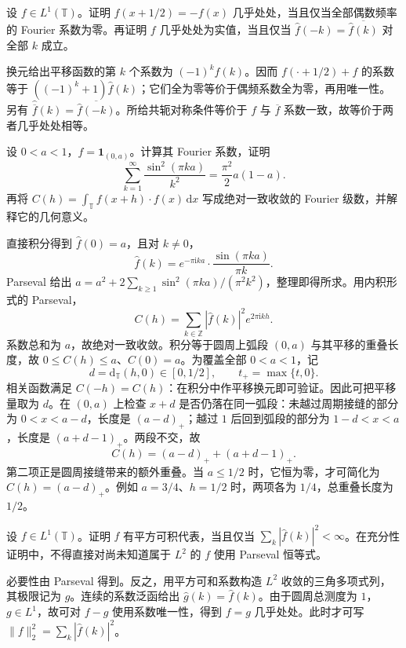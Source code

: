 \begin{exercise}\label{b2:ex:02-antiperiodic}
设 \(f\in L^1(\mathbb T)\)。证明 \(f(x+1/2)=-f(x)\) 几乎处处，当且仅当全部偶数频率的 Fourier 系数为零。再证明 \(f\) 几乎处处为实值，当且仅当 \(\widehat f(-k)=\overline{\widehat f(k)}\) 对全部 \(k\) 成立。
\end{exercise}
\begin{solution}
换元给出平移函数的第 \(k\) 个系数为 \((-1)^k\widehat f(k)\)。因而 \(f(\cdot+1/2)+f\) 的系数等于 \(((-1)^k+1)\widehat f(k)\)；它们全为零等价于偶频系数全为零，再用唯一性。另有 \(\widehat{\overline f}(k)=\overline{\widehat f(-k)}\)。所给共轭对称条件等价于 \(f\) 与 \(\overline f\) 系数一致，故等价于两者几乎处处相等。
\end{solution}

\begin{exercise}\label{b2:ex:02-interval-correlation}
设 \(0<a<1\)，\(f=\mathbf1_{(0,a)}\)。计算其 Fourier 系数，证明
\[
 \sum_{k=1}^\infty\dfrac{\sin^2(\pi ka)}{k^2}=\dfrac{\pi^2}2a(1-a).
\]
再将 \(C(h)=\int_{\mathbb T}f(x+h)\cdot f(x)\,\mathrm{d}x\) 写成绝对一致收敛的 Fourier 级数，并解释它的几何意义。
\end{exercise}
\begin{solution}
直接积分得到 \(\widehat f(0)=a\)，且对 \(k\ne0\)，
\[
 \widehat f(k)=e^{-\pi\mathrm{i}ka}\cdot\dfrac{\sin(\pi ka)}{\pi k}.
\]
Parseval 给出 \(a=a^2+2\sum_{k\geq1}\sin^2(\pi ka)/(\pi^2k^2)\)，整理即得所求。用内积形式的 Parseval，
\[
 C(h)=\sum_{k\in\mathbb Z}|\widehat f(k)|^2e^{2\pi\mathrm{i}kh}.
\]
系数总和为 \(a\)，故绝对一致收敛。积分等于圆周上弧段 \((0,a)\) 与其平移的重叠长度，故 \(0\leq C(h)\leq a\)、\(C(0)=a\)。为覆盖全部 \(0<a<1\)，记
\[
 d=\mathrm d_{\mathbb T}(h,0)\in[0,1/2],\qquad t_+=\max\{t,0\}.
\]
相关函数满足 \(C(-h)=C(h)\)：在积分中作平移换元即可验证。因此可把平移量取为 \(d\)。在 \((0,a)\) 上检查 \(x+d\) 是否仍落在同一弧段：未越过周期接缝的部分为 \(0<x<a-d\)，长度是 \((a-d)_+\)；越过 \(1\) 后回到弧段的部分为 \(1-d<x<a\)，长度是 \((a+d-1)_+\)。两段不交，故
\[
 C(h)=(a-d)_++(a+d-1)_+.
\]
第二项正是圆周接缝带来的额外重叠。当 \(a\leq1/2\) 时，它恒为零，才可简化为 \(C(h)=(a-d)_+\)。例如 \(a=3/4\)、\(h=1/2\) 时，两项各为 \(1/4\)，总重叠长度为 \(1/2\)。
\end{solution}

\begin{exercise}\label{b2:ex:02-l1-l2-criterion}
设 \(f\in L^1(\mathbb T)\)。证明 \(f\) 有平方可积代表，当且仅当 \(\sum_k|\widehat f(k)|^2<\infty\)。在充分性证明中，不得直接对尚未知道属于 \(L^2\) 的 \(f\) 使用 Parseval 恒等式。
\end{exercise}
\begin{solution}
必要性由 Parseval 得到。反之，用平方可和系数构造 \(L^2\) 收敛的三角多项式列，其极限记为 \(g\)。连续的系数泛函给出 \(\widehat g(k)=\widehat f(k)\)。由于圆周总测度为 \(1\)，\(g\in L^1\)，故可对 \(f-g\) 使用系数唯一性，得到 \(f=g\) 几乎处处。此时才可写 \(\|f\|_2^2=\sum_k|\widehat f(k)|^2\)。
\end{solution}

